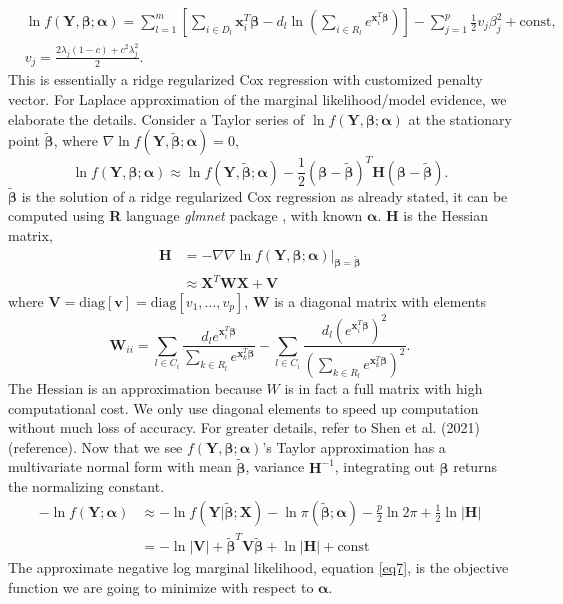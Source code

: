 \begin{equation} \label{eq6}
\begin{aligned}
    &\ln f(\bm{Y}, \bm{\beta};\bm{\alpha}) = \sum_{l=1}^{m}\left[\sum_{i\in D_l}\bm{x}_i^T\bm{\beta}-d_l\ln(\sum_{i\in R_l} e^{\bm{x}_i^T\bm{\beta}})\right] - \sum_{j=1}^{p} \frac{1}{2}v_j\beta_j^2 + \text{const}, \\
    &v_j = \frac{2\lambda_j(1-c)+c^2\lambda_j^2}{2}.
\end{aligned}
\end{equation}
This is essentially a ridge regularized Cox regression with customized penalty vector. 
For Laplace approximation of the marginal likelihood/model evidence, we elaborate the details. Consider a Taylor series of $\ln f(\bm{Y}, \bm{\beta};\bm{\alpha})$ at the stationary point $\widetilde{\bm{\beta}}$, where $\nabla \ln f(\bm{Y}, \widetilde{\bm{\beta}};\bm{\alpha})=0$,
$$ \ln f(\bm{Y}, \bm{\beta};\bm{\alpha}) \approx \ln f(\bm{Y}, \widetilde{\bm{\beta}};\bm{\alpha}) - \frac{1}{2}(\bm{\beta}-\widetilde{\bm{\beta}})^T\bm{H}(\bm{\beta}-\widetilde{\bm{\beta}}). $$
$\widetilde{\bm{\beta}}$ is the solution of a ridge regularized Cox regression as already stated, it can be computed using \textbf{R} language \emph{glmnet} package \citep{simon2011regularization}, with known $\bm{\alpha}$. $\bm{H}$ is the Hessian matrix,
\begin{align*}
    \bm{H} &= - \nabla\nabla \ln f(\bm{Y}, \bm{\beta};\bm{\alpha})|_{\bm{\beta}=\widetilde{\bm{\beta}}} \\
    & \approx \bm{X}^T\bm{W}\bm{X} + \bm{V}
\end{align*}
where $\bm{V} = \text{diag}[\bm{v}]=\text{diag}[v_1,\dots,v_p]$, $\bm{W}$ is a diagonal matrix with elements 
$$ \bm{W}_{ii} = \sum_{l\in C_i}\frac{d_le^{\bm{x}_i^T\bm{\beta}}}{\sum_{k\in R_l}e^{\bm{x}_k^T\bm{\beta}}} - \sum_{l\in C_i}\frac{d_l(e^{\bm{x}_i^T\bm{\beta}})^2}{(\sum_{k\in R_l}e^{\bm{x}_k^T\bm{\beta}})^2}. $$ 
The Hessian is an approximation because $W$ is in fact a full matrix with high computational cost. We only use diagonal elements to speed up computation without much loss of accuracy. For greater details, refer to Shen et al. (2021) (reference).
Now that we see $f(\bm{Y}, \bm{\beta};\bm{\alpha})$'s Taylor approximation has a multivariate normal form with mean $\widetilde{\bm{\beta}}$, variance $\bm{H}^{-1}$, integrating out $\bm{\beta}$ returns the normalizing constant.
\begin{equation} \label{eq7}
\begin{aligned}
    -\ln{f(\bm{Y};\bm{\alpha})} &\approx -\ln f(\bm{Y}|\widetilde{\bm{\beta}};\bm{X}) - \ln \pi(\widetilde{\bm{\beta}};\bm{\alpha}) - \frac{p}{2}\ln{2\pi} + \frac{1}{2}\ln{|\bm{H}|} \\
    &= -\ln{|\bm{V}|} + \widetilde{\bm{\beta}}^T\bm{V}\widetilde{\bm{\beta}} + \ln{|\bm{H}|} + \text{const}
\end{aligned}
\end{equation}
The approximate negative log marginal likelihood, equation \eqref{eq7}, is the objective function we are going to minimize with respect to $\bm{\alpha}$.

